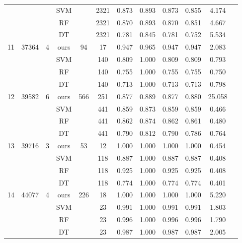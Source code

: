 \begin{table}[htbp]
\begin{tabular}{cccccccccccc}
           &       &    & SVM  &     & 2321 & 0.873 & 0.893 & 0.873 & 0.855 & 4.174 \\
           &       &    & RF   &     & 2321 & 0.870 & 0.893 & 0.870 & 0.851 & 4.667 \\
           &       &    & DT   &     & 2321 & 0.781 & 0.845 & 0.781 & 0.752 & 5.534 \\
        \midrule
        11 & 37364 & 4 & ours & 94  & 17  & 0.947 & 0.965 & 0.947 & 0.947 & 2.083 \\
           &       &   & SVM  &     & 140 & 0.809 & 1.000 & 0.809 & 0.809 & 0.793 \\
           &       &   & RF   &     & 140 & 0.755 & 1.000 & 0.755 & 0.755 & 0.750 \\
           &       &   & DT   &     & 140 & 0.713 & 1.000 & 0.713 & 0.713 & 0.798 \\
        \midrule
        12 & 39582 & 6 & ours & 566 & 251 & 0.877 & 0.889 & 0.877 & 0.880 & 25.058\\
           &       &   & SVM  &     & 441 & 0.859 & 0.873 & 0.859 & 0.859 & 0.466 \\
           &       &   & RF   &     & 441 & 0.862 & 0.874 & 0.862 & 0.861 & 0.480 \\
           &       &   & DT   &     & 441 & 0.790 & 0.812 & 0.790 & 0.786 & 0.764 \\
        \midrule
        13 & 39716 & 3 & ours & 53  & 12  & 1.000 & 1.000 & 1.000 & 1.000 & 0.454 \\
           &       &   & SVM  &     & 118 & 0.887 & 1.000 & 0.887 & 0.887 & 0.408 \\
           &       &   & RF   &     & 118 & 0.925 & 1.000 & 0.925 & 0.925 & 0.408 \\
           &       &   & DT   &     & 118 & 0.774 & 1.000 & 0.774 & 0.774 & 0.401 \\
        \midrule
        14 & 44077 & 4 & ours & 226 & 18  & 1.000 & 1.000 & 1.000 & 1.000 & 5.220 \\
           &       &   & SVM  &     & 23  & 0.991 & 1.000 & 0.991 & 0.991 & 1.803 \\
           &       &   & RF   &     & 23  & 0.996 & 1.000 & 0.996 & 0.996 & 1.790 \\
           &       &   & DT   &     & 23  & 0.987 & 1.000 & 0.987 & 0.987 & 2.005 \\
    
    \midrule
  \end{tabular}
\end{table}

